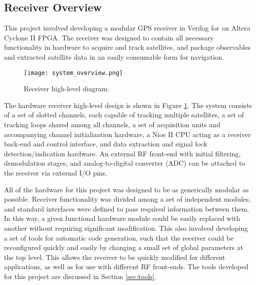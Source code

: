 \documentclass[12pt]{article}
\begin{document}
\subsection{Receiver Overview}
This project involved developing a modular GPS receiver in Verilog for an Altera Cyclone II FPGA. The receiver was designed to contain all necessary functionality in hardware to acquire and track satellites, and package observables and extracted satellite data in an easily consumable form for navigation.

\begin{figure}
\centering
\texttt{[image: system\_overview.png]}
\caption{Receiver high-level diagram.}
\label{img:overview}
\end{figure}

The hardware receiver high-level design is shown in Figure \ref{img:overview}. The system consists of a set of slotted channels, each capable of tracking multiple satellites, a set of tracking loops shared among all channels, a set of acquisition units and accompanying channel initialization hardware, a Nios II CPU acting as a receiver back-end and control interface, and data extraction and signal lock detection/indication hardware. An external RF front-end with initial filtering, demodulation stages, and analog-to-digital converter (ADC) can be attached to the receiver via external I/O pins.

All of the hardware for this project was designed to be as generically modular as possible. Receiver functionality was divided among a set of independent modules, and standard interfaces were defined to pass required information between them. In this way, a given functional hardware module could be easily replaced with another without requiring significant modification. This also involved developing a set of tools for automatic code generation, such that the receiver could be reconfigured quickly and easily by changing a small set of global parameters at the top level. This allows the receiver to be quickly modified for different applications, as well as for use with different RF front-ends. The tools developed for this project are discussed in Section \ref{sec:tools}.
\end{document}
